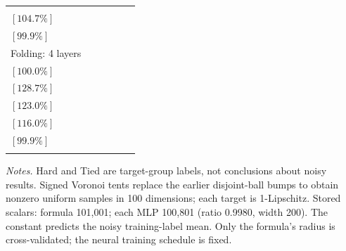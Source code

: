 \begin{table}[t]
\begin{subtable}{\textwidth}
{\begin{tabular}{@{}lccccc@{}}
  \shortstack{$(1.258\pm 0.051)\times10^{-1}$\\$[104.7\%]$} &
  \shortstack{$(1.200\pm 0.036)\times10^{-1}$\\$[99.9\%]$} \\
\addlinespace[3pt]
Folding: 4 layers &
  \shortstack{$(4.225\pm 0.278)\times10^{-2}$\\$[100.0\%]$} &
  \shortstack{$(5.436\pm 0.261)\times10^{-2}$\\$[128.7\%]$} &
  \shortstack{$(5.198\pm 0.220)\times10^{-2}$\\$[123.0\%]$} &
  \shortstack{$(4.903\pm 0.264)\times10^{-2}$\\$[116.0\%]$} &
  \shortstack{$(4.219\pm 0.269)\times10^{-2}$\\$[99.9\%]$} \\
\addlinespace[3pt]
\bottomrule
\end{tabular}%
}
\end{subtable}
\par\smallskip
\begin{minipage}{\textwidth}
\footnotesize
\emph{Notes.} Hard and Tied are target-group labels, not conclusions about noisy results. Signed Voronoi tents replace the earlier disjoint-ball bumps to obtain nonzero uniform samples in 100 dimensions; each target is 1-Lipschitz. Stored scalars: formula 101,001; each MLP 100,801 (ratio 0.9980, width 200). The constant predicts the noisy training-label mean. Only the formula's radius is cross-validated; the neural training schedule is fixed.
\end{minipage}
\end{table}

